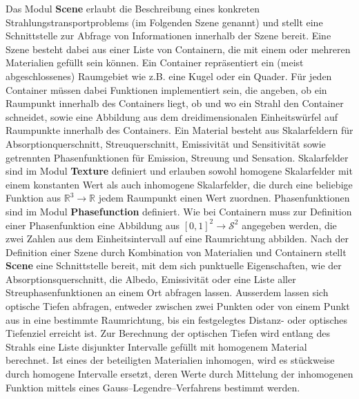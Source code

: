 	Das Modul \textbf{Scene} erlaubt die Beschreibung eines konkreten Strahlungstransportproblems (im Folgenden Szene genannt) und stellt eine Schnittstelle zur Abfrage von Informationen innerhalb der Szene bereit. Eine Szene besteht dabei aus einer Liste von Containern, die mit einem oder mehreren Materialien gefüllt sein können. Ein Container repräsentiert ein (meist abgeschlossenes) Raumgebiet wie z.B. eine Kugel oder ein Quader. Für jeden Container müssen dabei Funktionen implementiert sein, die angeben, ob ein Raumpunkt innerhalb des Containers liegt, ob und wo ein Strahl den Container schneidet, sowie eine Abbildung aus dem dreidimensionalen Einheitswürfel auf Raumpunkte innerhalb des Containers. Ein Material besteht aus Skalarfeldern für Absorptionquerschnitt, Streuquerschnitt, Emissivität und Sensitivität sowie getrennten Phasenfunktionen für Emission, Streuung und Sensation. Skalarfelder sind im Modul \textbf{Texture} definiert und erlauben sowohl homogene Skalarfelder mit einem konstanten Wert als auch inhomogene Skalarfelder, die durch eine beliebige Funktion aus $\mathbb{R}^3\to\mathbb{R}$ jedem Raumpunkt einen Wert zuordnen. Phasenfunktionen sind im Modul \textbf{Phasefunction} definiert. Wie bei Containern muss zur Definition einer Phasenfunktion eine Abbildung aus $[0,1]^2\to\mathcal{S}^2$ angegeben werden, die zwei Zahlen aus dem Einheitsintervall auf eine Raumrichtung abbilden. Nach der Definition einer Szene durch Kombination von Materialien und Containern stellt \textbf{Scene} eine Schnittstelle bereit, mit dem sich punktuelle Eigenschaften, wie der Absorptionsquerschnitt, die Albedo, Emissivität oder eine Liste aller Streuphasenfunktionen an einem Ort abfragen lassen. Ausserdem lassen sich optische Tiefen abfragen, entweder zwischen zwei Punkten oder von einem Punkt aus in eine bestimmte Raumrichtung, bis ein festgelegtes Distanz- oder optisches Tiefenziel erreicht ist. Zur Berechnung der optischen Tiefen wird entlang des Strahls eine Liste disjunkter Intervalle gefüllt mit homogenem Material berechnet. Ist eines der beteiligten Materialien inhomogen, wird es stückweise durch homogene Intervalle ersetzt, deren Werte durch Mittelung der inhomogenen Funktion mittels eines Gauss--Legendre--Verfahrens bestimmt werden.
	

